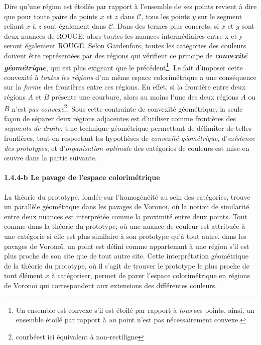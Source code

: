\documentclass{article}
\newcommand{\bolditalic}[1]{\textbf{\textit{#1}}}
\begin{document}
	Dire qu’une région est étoilée par rapport à l’ensemble de ses points revient à dire que pour toute paire de points $x$ et $z$ dans $\mathcal{C}$, tous les points $y$ sur le segment reliant $x$ à $z$ sont également dans $\mathcal{C}$. Dans des termes plus concrets, si $x$ et $y$ sont deux nuances de ROUGE, alors toutes les nuances intermédiaires entre x et y seront également ROUGE. Selon Gärdenfors, toutes les catégories des couleurs doivent être représentées par des régions qui vérifient ce principe de \bolditalic{convexité géométrique}, qui est plus exigeant que le précédent\footnote{Un ensemble est convexe s'il est étoilé par rapport à \textit{tous} ses points, ainsi, un ensemble étoilé par rapport à \textit{un} point n’est pas nécessairement convexe.}. Le fait d'imposer cette convexité à \textit{toutes les régions} d'un même espace colorimétrique a une conséquence sur la \textit{forme} des frontières entre ces régions. En effet, si la frontière entre deux régions $A$ et $B$ présente une courbure, alors au moins l'une des deux régions $A$ ou $B$ n’est \textit{pas convexe}\footnote{ \og courbé\fg est ici équivalent à \og non-rectiligne \fg}. Sous cette contrainte de convexité géométrique, la seule façon de séparer deux régions adjacentes est d’utiliser comme frontières des \textit{segments de droite}. Une technique géométrique permettant de délimiter de telles frontières, tout en respectant les hypothèses de \textit{convexité géométrique}, d’\textit{existence des prototypes}, et d’\textit{organisation optimale} des catégories de couleurs est mise en œuvre dans la partie suivante.

\paragraph{1.4.4-b Le pavage de l’espace colorimétrique}\mbox{} 

 La théorie du prototype, fondée sur l’homogénéité au sein des catégories, trouve un parallèle géométrique dans les pavages de Voronoï, où la notion de similarité entre deux nuances est interprétée comme la proximité entre deux points. Tout comme dans la théorie du prototype, où une nuance de couleur est attribuée à une catégorie si elle est plus similaire à son prototype qu’à tout autre, dans les pavages de Voronoï, un point est défini comme appartenant à une région s’il est plus proche de son site que de tout autre site. Cette interprétation géométrique de la théorie du prototype, où il s’agit de trouver le prototype le plus proche de tout élément \( x \) à catégoriser, permet de paver l’espace colorimétrique en régions de Voronoï qui correspondent aux extensions des différentes couleurs.
\end{document}
